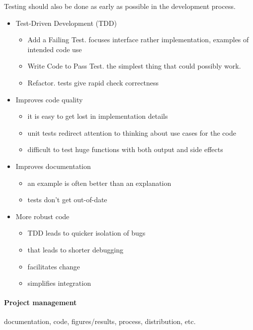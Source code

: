 \documentclass[ChapterTOCs,krantz2]{krantz} %
\begin{document}
Testing should also be done as early as possible in the development process.
\begin{itemize}
\item Test-Driven Development (TDD)
\begin{itemize}
 \item Add a Failing Test. focuses interface rather implementation, examples of intended code use 
 \item Write Code to Pass Test. the simplest thing that could possibly work.
 \item Refactor. tests give rapid check correctness
\end{itemize}

\item Improves code quality

\begin{itemize}
\item it is easy to get lost in implementation details
\item unit tests redirect attention to thinking about use cases for the code
\item difficult to test huge functions with both output and side effects
\end{itemize}

\item Improves documentation
\begin{itemize}
\item an example is often better than an explanation
\item tests don't get out-of-date
\end{itemize}

\item More robust code

\begin{itemize}
\item TDD leads to quicker isolation of bugs
\item that leads to shorter debugging
\item facilitates change
\item simplifies integration
\end{itemize}

\end{itemize}

\paragraph{ {\bf Project management}}

documentation, code, figures/results, process, distribution, etc.
\end{document}
